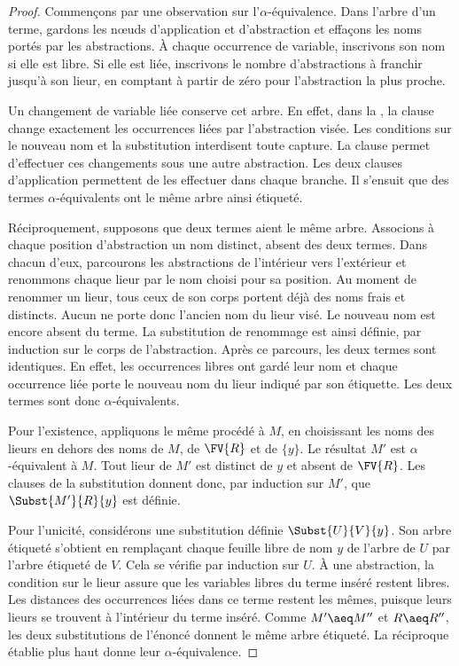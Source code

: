 \documentclass[../../../include/open-logic-section]{subfiles}
\begin{document}
\begin{proof}
Commençons par une observation sur l'$\alpha$-équivalence.
Dans l'arbre d'un terme, gardons les nœuds d'application et
d'abstraction et effaçons les noms portés par les abstractions.
À chaque occurrence de variable, inscrivons son nom si elle est
libre. Si elle est liée, inscrivons le nombre d'abstractions à
franchir jusqu'à son lieur, en comptant à partir de zéro pour
l'abstraction la plus proche.

Un changement de variable liée conserve cet arbre. En effet, dans
la , la clause 
change exactement les occurrences liées par l'abstraction visée.
Les conditions sur le nouveau nom et la substitution interdisent
toute capture. La clause  permet
d'effectuer ces changements sous une autre abstraction. Les deux
clauses d'application permettent de les effectuer dans chaque
branche. Il s'ensuit que des termes $\alpha$-équivalents ont le
même arbre ainsi étiqueté.

Réciproquement, supposons que deux termes aient le même arbre.
Associons à chaque position d'abstraction un nom distinct, absent
des deux termes. Dans chacun d'eux, parcourons les abstractions de l'intérieur
vers l'extérieur et renommons chaque lieur par le nom choisi
pour sa position. Au moment de renommer un lieur, tous ceux de
son corps portent déjà des noms frais et distincts. Aucun ne
porte donc l'ancien nom du lieur visé. Le nouveau nom est encore
absent du terme. La substitution de renommage est ainsi définie,
par induction sur le corps de l'abstraction. Après ce parcours,
les deux termes sont identiques.
En effet, les occurrences libres ont gardé leur nom et chaque
occurrence liée porte le nouveau nom du lieur indiqué par son
étiquette. Les deux termes sont donc $\alpha$-équivalents.

Pour l'existence, appliquons le même procédé à $M$, en choisissant
les noms des lieurs en dehors des noms de $M$, de $\FV{R}$ et de
$\{y\}$. Le résultat $M'$ est $\alpha$-équivalent à $M$. Tout
lieur de $M'$ est distinct de $y$ et absent de $\FV{R}$. Les
clauses de la substitution donnent donc, par induction sur $M'$,
que $\Subst{M'}{R}{y}$ est définie.

Pour l'unicité, considérons une substitution définie
$\Subst{U}{V}{y}$. Son arbre étiqueté s'obtient en remplaçant
chaque feuille libre de nom $y$ de l'arbre de $U$ par l'arbre
étiqueté de $V$. Cela se vérifie par induction sur $U$. À une
abstraction, la condition sur le lieur assure que les variables
libres du terme inséré restent libres. Les distances des
occurrences liées dans ce terme restent les mêmes, puisque
leurs lieurs se trouvent à l'intérieur du terme inséré. Comme
$M' \aeq M''$ et $R \aeq R''$, les deux substitutions de
l'énoncé donnent le même arbre étiqueté. La réciproque établie
plus haut donne leur $\alpha$-équivalence.
\end{proof}
\end{document}
